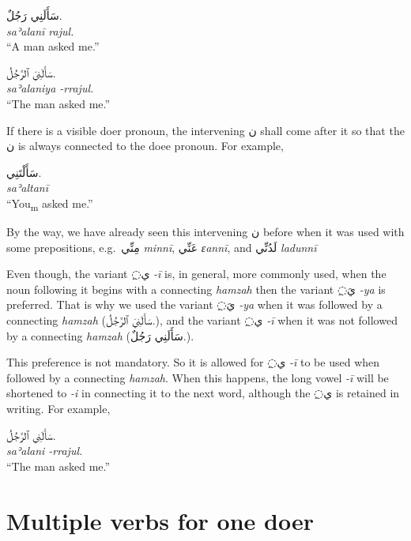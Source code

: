 \documentclass[
  10pt,
]{book}
\begin{document}
\begin{itemize}
  \foreignlanguage{arabic}{سَأَلَنِي رَجُلٌ.}\\
  \emph{saʾalanī rajul.}\\
  \enquote{A man asked me.}

  \foreignlanguage{arabic}{سَأَلَنِيَ ٱلرَّجُلُ.}\\
  \emph{saʾalaniya -rrajul.}\\
  \enquote{The man asked me.}

  If there is a visible doer pronoun, the intervening \foreignlanguage{arabic}{ن} shall come after it so that the \foreignlanguage{arabic}{ن} is always connected to the doee pronoun. For example,

  \foreignlanguage{arabic}{سَأَلْتَنِي.}\\
  \emph{saʾaltanī}\\
  \enquote{You\textsubscript{m} asked me.}

  By the way, we have already seen this intervening \foreignlanguage{arabic}{ن} before when it was used with some prepositions, e.g.~\foreignlanguage{arabic}{مِنِّي} \emph{minnī}, \foreignlanguage{arabic}{عَنِّي} \emph{ɛannī}, and \foreignlanguage{arabic}{لَدُنِّي} \emph{ladunnī}

  Even though, the variant \foreignlanguage{arabic}{◌ِي} \emph{-ī} is, in general, more commonly used, when the noun following it begins with a connecting \emph{hamzah} then the variant \foreignlanguage{arabic}{◌ِيَ} \emph{-ya} is preferred. That is why we used the variant \foreignlanguage{arabic}{◌ِيَ} \emph{-ya} when it was followed by a connecting \emph{hamzah} (\foreignlanguage{arabic}{سَأَلَنِيَ ٱلرَّجُلُ.}), and the variant \foreignlanguage{arabic}{◌ِي} \emph{-ī} when it was not followed by a connecting \emph{hamzah} (\foreignlanguage{arabic}{سَأَلَنِي رَجُلٌ.}).

  This preference is not mandatory. So it is allowed for \foreignlanguage{arabic}{◌ِي} \emph{-ī} to be used when followed by a connecting \emph{hamzah}. When this happens, the long vowel \emph{-ī} will be shortened to \emph{-i} in connecting it to the next word, although the \foreignlanguage{arabic}{◌ِي} is retained in writing. For example,

  \foreignlanguage{arabic}{سَأَلَنِي ٱلرَّجُلُ.}\\
  \emph{saʾalani -rrajul.}\\
  \enquote{The man asked me.}
\end{itemize}

\section{Multiple verbs for one doer}\label{multiple-verbs-for-one-doer}
\end{document}
